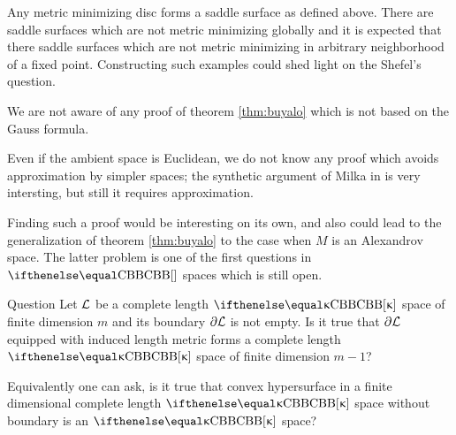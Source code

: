Any metric minimizing disc forms a saddle surface as defined above.
There are saddle surfaces which are not metric minimizing globally and it is expected that there saddle surfaces which are not metric minimizing in arbitrary neighborhood of a fixed point.
Constructing such examples could shed light on the Shefel's question.

We are not aware of any proof of theorem \ref{thm:buyalo} which is not based on the Gauss formula.

Even if the ambient space is Euclidean, we do not know any proof which avoids approximation by simpler spaces;
the synthetic argument of Milka in \cite{milka-conv} is very intersting, 
but still it requires approximation.

Finding such a proof would be interesting on its own, and also could lead to the generalization of theorem \ref{thm:buyalo} to the case when $M$ is an Alexandrov space.
The latter problem is one of the first questions in $\Alex{}$ spaces which is still open.

\begin{thm}{Question}
Let $\mathcal{L}$ be a complete length $\Alex{\kappa}$ space of finite dimension $m$ and its boundary $\partial\mathcal{L}$ is not empty.
Is it true that $\partial\mathcal{L}$ equipped with induced length metric forms a complete length $\Alex{\kappa}$ space of finite dimension $m-1$?
\end{thm}

Equivalently one can ask, is it true that convex hypersurface in a finite dimensional complete length $\Alex\kappa$ space without boundary is an $\Alex{\kappa}$ space?

